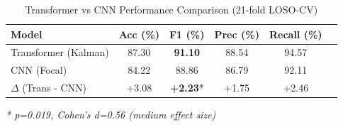 
\begin{table}[htbp]
\centering
\caption{Transformer vs CNN Performance Comparison (21-fold LOSO-CV)}
\label{tab:main_comparison}
\begin{tabular}{@{}lccccc@{}}
\toprule
\textbf{Model} & \textbf{Acc (\%)} & \textbf{F1 (\%)} & \textbf{Prec (\%)} & \textbf{Recall (\%)} \\
\midrule
Transformer (Kalman) & 87.30 & \textbf{91.10} & 88.54 & 94.57 \\
CNN (Focal) & 84.22 & 88.86 & 86.79 & 92.11 \\
\midrule
$\Delta$ (Trans - CNN) & +3.08 & \textbf{+2.23}* & +1.75 & +2.46 \\

\bottomrule
\end{tabular}
\vspace{1mm}
\scriptsize
\textit{* p=0.019, Cohen's d=0.56 (medium effect size)}
\end{table}
